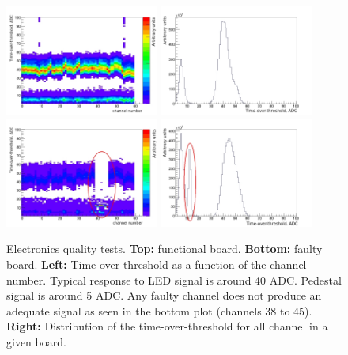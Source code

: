 \documentclass[a4paper,11pt]{article}
\begin{document}
\begin{figure}[htb]
 \centering
 \includegraphics[width=0.45\textwidth]{./pl1_tot1}
 \includegraphics[width=0.45\textwidth]{./pl1_tot2}\\
 \includegraphics[width=0.45\textwidth]{./pl2_tot1}
 \includegraphics[width=0.45\textwidth]{./pl2_tot2}
 \caption[Electronics quality tests]{Electronics quality tests. {\bf Top:} functional board. {\bf Bottom:} faulty board. {\bf Left:} Time-over-threshold
 as a function of the channel number. Typical response to LED signal is around 40 ADC. Pedestal signal is around 5 ADC. Any faulty channel does not produce
 an adequate signal as seen in the bottom plot (channels 38 to 45). {\bf Right:} Distribution of the time-over-threshold for all channel in a given board.}
 \label{fig:tot_feb_dbb_test}
\end{figure}
\end{document}
